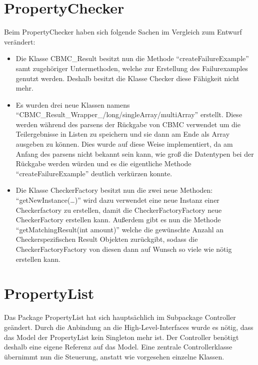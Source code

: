 \documentclass[a4paper]{scrreprt}
\begin{document}
\section{PropertyChecker}
Beim PropertyChecker haben sich folgende Sachen im Vergleich zum Entwurf
verändert:
\begin{itemize}
\item Die Klasse CBMC\_Result besitzt nun die Methode ``createFailureExample''
  samt zugehöriger Untermethoden, welche zur Erstellung des Failurexamples
  genutzt werden. Deshalb besitzt die Klasse Checker diese Fähigkeit nicht mehr.

\item Es wurden drei neue Klassen namens
``CBMC\_Result\_Wrapper\_/long/singleArray/multiArray'' erstellt. Diese werden
während des parsens der Rückgabe von CBMC verwendet um die Teilergebnisse in
Listen zu speichern und sie dann am Ende als Array ausgeben zu können. Dies
wurde auf diese Weise implementiert, da am Anfang des parsens nicht bekannt
sein kann, wie groß die Datentypen bei der Rückgabe werden würden und es die
eigentliche Methode ``createFailureExample'' deutlich verkürzen konnte.

\item Die Klasse CheckerFactory besitzt nun die zwei neue Methoden: \newline
``getNewInstance(\ldots)'' wird dazu verwendet eine neue Instanz einer
Checkerfactory zu erstellen, damit die CheckerFactoryFactory neue CheckerFactory
erstellen kann. \newline Außerdem gibt es nun die Methode ``getMatchingResult(int
amount)'' welche die gewünschte Anzahl an Checkerspezifischen Result Objekten
zurückgibt, sodass die CheckerFactoryFactory von diesen dann auf Wunsch so viele
wie nötig erstellen kann.

\end{itemize}


\section{PropertyList}

Das Package PropertyList hat sich hauptsächlich im Subpackage Controller geändert. Durch die Anbindung an die High-Level-Interfaces wurde es nötig, dass das Model der PropertyList kein Singleton mehr ist. Der Controller benötigt deshalb eine eigene Referenz auf das Model. Eine zentrale Controllerklasse übernimmt nun die Steuerung, anstatt wie vorgesehen einzelne Klassen.
\end{document}
